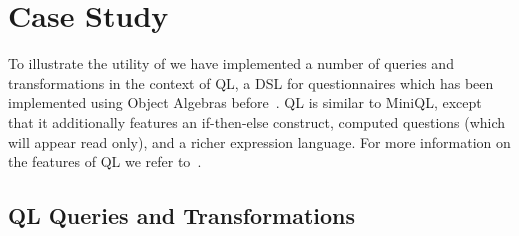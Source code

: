 \section{Case Study}\label{sec:case_study}

To illustrate the utility of \name we have implemented a number of
queries and transformations in the context of QL, a DSL for
questionnaires which has been implemented using Object Algebras
before~\cite{gouseti14extensible}.  QL is similar to MiniQL, except that
it additionally features an if-then-else construct, computed questions
(which will appear read only), and a richer expression language.  For
more information on the features of QL we refer
to~\cite{erdweg2013state}.




\subsection{QL Queries and Transformations}

